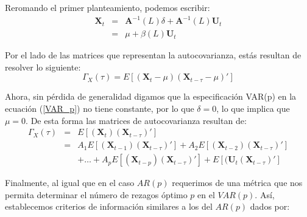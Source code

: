 \documentclass[
  a4paper,
]{article}
\begin{document}
Reromando el primer planteamiento, podemos escribir: \begin{eqnarray}
    \mathbf{X}_t & = & \mathbf{A}^{-1}(L) \delta + \mathbf{A}^{-1}(L) \mathbf{U}_t \nonumber \\
    & = & \mu + \beta(L) \mathbf{U}_t
    \label{VARMA_q}
\end{eqnarray}

Por el lado de las matrices que representan la autocovarianza, estás
resultan de resolver lo siguiente: \[
    \Gamma_X(\tau) = E[(\mathbf{X}_t - \mu)(\mathbf{X}_{t-\tau} - \mu)'] 
\]

Ahora, sin pérdida de generalidad digamos que la especificación VAR(p)
en la ecuación (\ref{VAR_p}) no tiene constante, por lo que
\(\delta = 0\), lo que implica que \(\mu = 0\). De esta forma las
matrices de autocovarianza resultan de: \begin{eqnarray*}
    \Gamma_X(\tau) & = & E[(\mathbf{X}_t)(\mathbf{X}_{t-\tau})'] \\
    & = & A_1 E[(\mathbf{X}_{t-1})(\mathbf{X}_{t-\tau})'] + A_2 E[(\mathbf{X}_{t-2})(\mathbf{X}_{t-\tau})'] \\
    &   & + \ldots + A_p E[(\mathbf{X}_{t-p})(\mathbf{X}_{t-\tau})'] + E[(\mathbf{U}_t(\mathbf{X}_{t-\tau})']
\end{eqnarray*}

Finalmente, al igual que en el caso \(AR(p)\) requerimos de una métrica
que nos permita determinar el número de rezagos óptimo \(p\) en el
\(VAR(p)\). Así, establecemos criterios de información similares a los
del \(AR(p)\) dados por:
\end{document}
